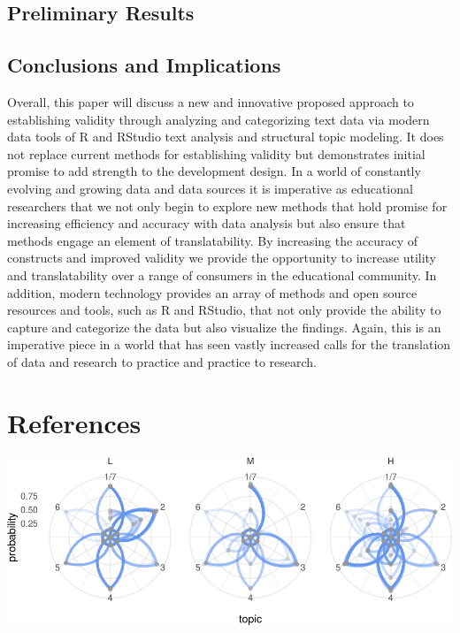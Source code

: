 \documentclass[doc]{apa6}
\theoremstyle{definition}
\theoremstyle{definition}
\theoremstyle{definition}
\theoremstyle{remark}
\begin{document}
\hypertarget{preliminary-results}{%
\subsection{Preliminary Results}\label{preliminary-results}}

\hypertarget{conclusions-and-implications}{%
\subsection{Conclusions and
Implications}\label{conclusions-and-implications}}

Overall, this paper will discuss a new and innovative proposed approach
to establishing validity through analyzing and categorizing text data
via modern data tools of R and RStudio text analysis and structural
topic modeling. It does not replace current methods for establishing
validity but demonstrates initial promise to add strength to the
development design. In a world of constantly evolving and growing data
and data sources it is imperative as educational researchers that we not
only begin to explore new methods that hold promise for increasing
efficiency and accuracy with data analysis but also ensure that methods
engage an element of translatability. By increasing the accuracy of
constructs and improved validity we provide the opportunity to increase
utility and translatability over a range of consumers in the educational
community. In addition, modern technology provides an array of methods
and open source resources and tools, such as R and RStudio, that not
only provide the ability to capture and categorize the data but also
visualize the findings. Again, this is an imperative piece in a world
that has seen vastly increased calls for the translation of data and
research to practice and practice to research.

\newpage

\hypertarget{references}{%
\section{References}\label{references}}

\includegraphics{ncme19_files/figure-latex/modeling-1.pdf}
\end{document}

